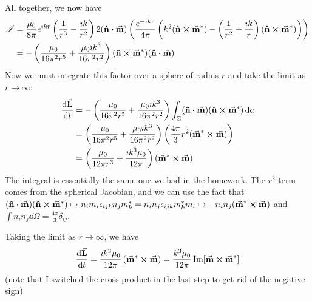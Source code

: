 \documentclass[a4paper,twoside]{article}
\begin{document}
\begin{itemize}
\begin{problem}
            All together, we now have
            \begin{align}
                \mathscr{I} &= \frac{\mu_0}{8 \pi} e^{\imath kr} \left( \frac{1}{r^3} - \frac{\imath k}{r^2} \right) 2 (\vu{n} \vdot \va{m})\left( \frac{e^{- \imath kr}}{4 \pi} \left( k^2 (\vu{n} \cross \va{m}^*) - \left( \frac{1}{r^2} + \frac{\imath k}{r} \right) (\vu{n} \cross \va{m}^*) \right) \right) \\
                &= - \left( \frac{\mu_0}{16 \pi^2 r^5} + \frac{\mu_0 \imath k^3}{16 \pi^2 r^2} \right) (\vu{n} \cross \va{m}^*)( \vu{n} \vdot \va{m}) 
            \end{align}
            Now we must integrate this factor over a sphere of radius $ r $ and take the limit as $ r \to \infty $:
            \begin{align}
                \dv{ \va{L}}{t} &= - \left( \frac{\mu_0}{16 \pi^2 r^5} + \frac{\mu_0 \imath k^3}{16 \pi^2 r^2} \right) \int_{\Sigma} (\vu{n} \vdot \va{m})( \vu{n} \cross \va{m}^*) \dd{a} \\
                &= \left( \frac{\mu_0}{16 \pi^2 r^5} + \frac{\mu_0 \imath k^3}{16 \pi^2 r^2} \right) \left( \frac{4 \pi}{3} r^2 ( \va{m}^* \cross \va{m}) \right) \\
                &= \left( \frac{\mu_0}{12 \pi r^3} + \frac{\imath k^3 \mu_0}{12 \pi}  \right) ( \va{m}^* \cross \va{m})
            \end{align}
            The integral is essentially the same one we had in the homework. The $ r^2 $ term comes from the spherical Jacobian, and we can use the fact that $ (\vu{n} \vdot \va{m})( \vu{n} \cross \va{m}^*) \mapsto n_i m_i \epsilon_{ijk} n_j m_k^* = n_i n_j \epsilon_{ijk} m_k^* m_i \mapsto - n_i n_j ( \va{m}^* \cross \va{m}) $ and $ \int n_i n_j \dd{\Omega} = \frac{4 \pi}{3} \delta_{ij} $.

            Taking the limit as $ r \to \infty $, we have
            \begin{equation}
                \dv{ \va{L}}{t} = \frac{\imath k^3 \mu_0}{12 \pi} \left( \va{m}^* \cross \va{m} \right) = \frac{k^3 \mu_0}{12 \pi} \Im[ \va{m} \cross \va{m}^* ]
            \end{equation}
            (note that I switched the cross product in the last step to get rid of the negative sign)
        \end{problem}
\end{itemize}
\end{document}
